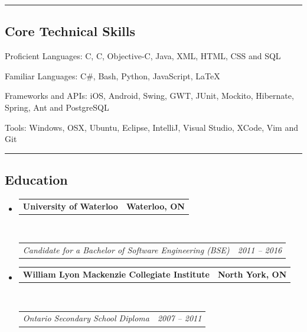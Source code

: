 \documentclass[10pt,letterpaper]{article}
\makeatletter
\newenvironment{indentsection}[1]%
{\begin{list}{}%
	{\setlength{\leftmargin}{#1}}%
	\item[]%
}
{\end{list}}
\newcommand{\headerrow}[2]
{\begin{tabular*}{\linewidth}{l@{\extracolsep{\fill}}r}
	#1 &
	#2 \\
\end{tabular*}}
\newcommand{\CPP}
{C\nolinebreak[4]\hspace{-.05em}\raisebox{.22ex}{\footnotesize\bf ++}}
\makeatother
\begin{document}
\hrule
\vspace{-0.4em}
\subsection*{Core Technical Skills}

\begin{indentsection}{\parindent}
\begin{description*}
	\item[Proficient Languages:]
	C, \CPP, Objective-C, Java, XML, HTML, CSS and SQL
	\item[Familiar Languages:]
	C\#, Bash, Python, JavaScript, \LaTeX
	\item[Frameworks and APIs:]
	iOS, Android, Swing, GWT, JUnit, Mockito, Hibernate, Spring, Ant and PostgreSQL
	\item[Tools:]
	Windows, OSX, Ubuntu, Eclipse, IntelliJ, Visual Studio, XCode, Vim and Git
\end{description*}
\end{indentsection}

\hrule
\vspace{-0.4em}
\subsection*{Education}

\begin{itemize}
	\parskip=0.1em

	\item 
	\headerrow
		{\textbf{University of Waterloo}}
		{\textbf{Waterloo, ON}}
	\\
	\headerrow
		{\emph{Candidate for a Bachelor of Software Engineering (BSE)}}
		{\emph{2011 -- 2016}}
		
	\item 
	\headerrow
		{\textbf{William Lyon Mackenzie Collegiate Institute}}
		{\textbf{North York, ON}}
	\\
	\headerrow
		{\emph{Ontario Secondary School Diploma}}
		{\emph{2007 -- 2011}}

\end{itemize}
\end{document}
